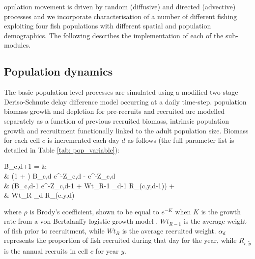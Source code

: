 \documentclass[review]{elsarticle}
\let\oldequation\equation
\let\oldendequation\endequation
\renewenvironment{equation}
 {\linenomathNonumbers\oldequation}
 {\oldendequation\endlinenomath}
\begin{document}
opulation movement is driven by
random (diffusive) and directed (advective) processes and we incorporate
characterisation of a number of different fishing 
exploiting four fish populations with different spatial and population
demographics. The following describes the implementation of each of the
sub-modules.

\clearpage


\subsection{Population dynamics}

The basic population level processes are simulated using a modified two-stage
Deriso-Schnute delay difference model \citep{Deriso1980, Schnute1985,
	Dichmont2003} occurring at a daily time-step. 
 population
biomass growth and depletion for pre-recruits and
recruited  are modelled
separately as a function of previous recruited biomass, intrinsic population
growth and recruitment functionally linked to the adult population size.
Biomass for each cell $c$ is incremented each day $d$ as follows (the full
parameter list is detailed in Table \ref{tab: pop_variable}): \begin{equation}
	\begin{split}
	B_{c,d+1} = &\\
	& (1 + \rho) B_{c,d} \cdot e^{-Z_{c,d}} - \rho \cdot e^{-Z_{c,d}} \hspace{2.9cm}
	\times \\  
	& (B_{c,d-1} \cdot e^{-Z_{c,d-1}} + Wt_{R-1} \cdot \alpha_{d-1} \cdot
	R_{(c,y,d-1)})
	\hspace{0.4cm} + \\
	& Wt_{R} \cdot \alpha_{d} \cdot R_{(c,y,d)} 
	\end{split}
\end{equation}
where $\rho$ is Brody's coefficient, shown to be equal to $e^{-K}$ when $K$ is
the growth rate from a von Bertalanffy logistic growth model
\citep{Schnute1985}. $Wt_{R-1}$ is the average weight of fish prior to
recruitment, while $Wt_{R}$ is the average recruited weight. $\alpha_{d}$
represents the proportion of fish recruited during that day for the year, while
$R_{c,\tilde{y}}$ is the annual recruits in cell $c$ for year $y$. \\
\end{document}
